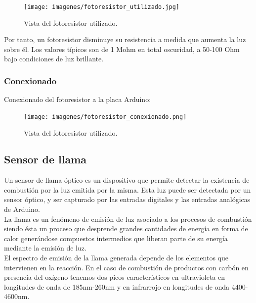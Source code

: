 \begin{figure}[H]
  \begin{center}
    \texttt{[image: imagenes/fotoresistor\_utilizado.jpg]}
  \end{center}
  \caption{Vista del fotoresistor utilizado.}
  \label{figura:micro_amplificacion}
\end{figure}


Por tanto, un fotoresistor disminuye su resistencia a medida que aumenta la luz sobre él. Los valores típicos son de 1 Mohm en total oscuridad, a 50-100 Ohm bajo condiciones de 
luz brillante.\\

\subsubsection{Conexionado}

Conexionado del fotoresistor a la placa Arduino:

\begin{figure}[H]
  \begin{center}
    \texttt{[image: imagenes/fotoresistor\_conexionado.png]}
  \end{center}
  \caption{Vista del fotoresistor utilizado.}
  \label{figura:micro_amplificacion}
\end{figure}


\subsection{Sensor de llama}

Un sensor de llama óptico es un dispositivo que permite detectar la existencia de combustión por la luz emitida por la misma. Esta luz puede ser detectada por un sensor óptico, 
y ser capturado por las entradas digitales y las entradas analógicas de Arduino.\\

La llama es un fenómeno de emisión de luz asociado a los procesos de combustión siendo ésta un proceso que desprende grandes cantidades de energía en forma de calor generándose
compuestos intermedios que liberan parte de su energía mediante la emisión de luz.\\

El espectro de emisión de la llama generada depende de los elementos que intervienen en la reacción. En el caso de combustión de productos con carbón en presencia del oxígeno 
tenemos dos picos característicos en ultravioleta en longitudes de onda de 185nm-260nm y en infrarrojo en longitudes de onda 4400-4600nm.\\

